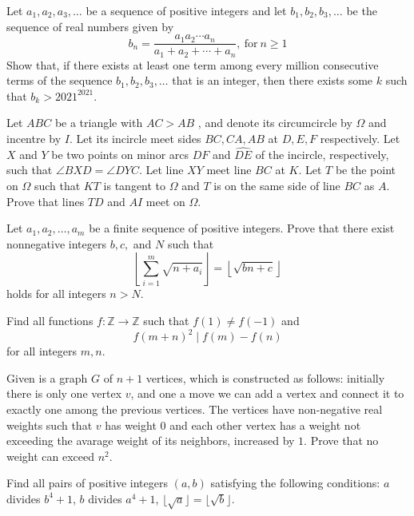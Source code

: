\documentclass[11pt]{scrartcl}
\begin{document}
\begin{problem}[372825050751557]
Let $a_1,a_2,a_3, \ldots$ be a sequence of positive integers and let $b_1,b_2,b_3,\ldots$ be the sequence of real numbers given by
$$b_n = \dfrac{a_1a_2\cdots a_n}{a_1+a_2+\cdots + a_n},\ \mbox{for}\ n\geq 1$$Show that, if there exists at least one term among every million consecutive terms of the sequence $b_1,b_2,b_3,\ldots$ that is an integer, then there exists some $k$ such that $b_k > 2021^{2021}$.
\end{problem}
\begin{problem}[487703623613277]
	Let $ABC$ be a triangle with $AC>AB$ , and denote its circumcircle by $\Omega$ and incentre by $I$. Let its incircle meet sides $BC,CA,AB$ at $D,E,F$ respectively. Let $X$ and $Y$ be two points on minor arcs $\widehat{DF}$ and $\widehat{DE}$ of the incircle, respectively, such that $\angle BXD = \angle DYC$. Let line $XY$ meet line $BC$ at $K$. Let $T$ be the point on $\Omega$ such that $KT$ is tangent to $\Omega$ and $T$ is on the same side of line $BC$ as $A$. Prove that lines $TD$ and $AI$ meet on $\Omega$.
\end{problem}
\begin{problem}[6051857606097163028]
Let $a_1,a_2,\dots,a_m$ be a finite sequence of positive integers. Prove that there exist nonnegative integers $b,c,$ and $N$ such that$$\left\lfloor \sum_{i=1}^m \sqrt{n+a_i} \right\rfloor =\left\lfloor \sqrt{bn+c} \right\rfloor$$holds for all integers $n>N.$
\end{problem}
\begin{problem}[8705251856251359603]
Find all functions $f:\mathbb{Z} \rightarrow \mathbb{Z}$ such that $f(1) \neq f(-1)$ and$$f(m+n)^2 \mid f(m)-f(n)$$for all integers $m, n$.
\end{problem}
\begin{problem}[493735785757154]
	Given is a graph $G$ of $n+1$ vertices, which is constructed as follows: initially there is only one vertex $v$, and one a move we can add a vertex and connect it to exactly one among the previous vertices. The vertices have non-negative real weights such that $v$ has weight $0$ and each other vertex has a weight not exceeding the avarage weight of its neighbors, increased by $1$. Prove that no weight can exceed $n^2$.
\end{problem}
\begin{problem}[600298381529685]
	Find all pairs of positive integers $(a,b)$ satisfying the following conditions:
$a$ divides $b^4+1$,
$b$ divides $a^4+1$,
$\lfloor\sqrt{a}\rfloor=\lfloor \sqrt{b}\rfloor$.
\end{problem}
\end{document}
